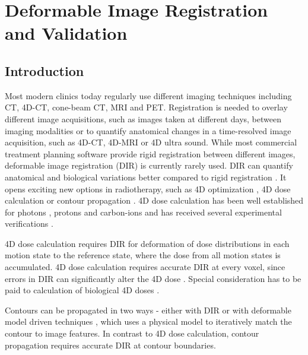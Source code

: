\documentclass[type=dr, dr=rernat, accentcolor=tud7b,colorbacktitle, bigchapter, openright, twoside, 12pt ]{tudthesis}
\begin{document}
\chapter{Deformable Image Registration and Validation}
\label{chapter:vmm}
\minitoc

\section{Introduction}


Most modern clinics today regularly use different imaging techniques including CT, 4D-CT, cone-beam CT, MRI and PET. Registration is needed to overlay different image acquisitions, such as images taken at different days,
between imaging modalities or to quantify anatomical changes in a time-resolved image acquisition, such as 4D-CT, 4D-MRI or 4D ultra sound. While most commercial treatment planning software provide rigid registration between different images, deformable image registration (DIR) is currently rarely used. 
DIR can quantify anatomical and biological variations better compared to rigid registration \cite{Sarrut2006}. It opens exciting new options in radiotherapy, such as 4D optimization \cite{Trofimov2005}, 
4D dose calculation \cite{Flampouri2006} or contour propagation \cite{Lu2006b}. 4D dose calculation has been well established for photons \cite{Ong2016}, protons \cite{Paganetti2005} and carbon-ions \cite{Gemmel2011} and has received
several experimental verifications \cite{Vinogradskiy2009, Perrin2016, Bert2012a}. 

4D dose calculation requires DIR for deformation of dose distributions in each motion state
to the reference state, where the dose from all motion states is accumulated. 4D dose calculation requires accurate DIR at every voxel, since errors in DIR can significantly alter the 4D dose \cite{Heath2006}. Special consideration has to be paid to calculation of biological 4D doses \cite{Gemmel2011}. 

Contours can be propagated in two ways - either with DIR \cite{Lu2006a, Rietzel2005a} or
with deformable model driven techniques \cite{McInerney1996}, which uses a physical model to iteratively match the contour to image features. In contrast to 4D dose calculation, contour propagation requires accurate DIR at contour boundaries.
\end{document}
